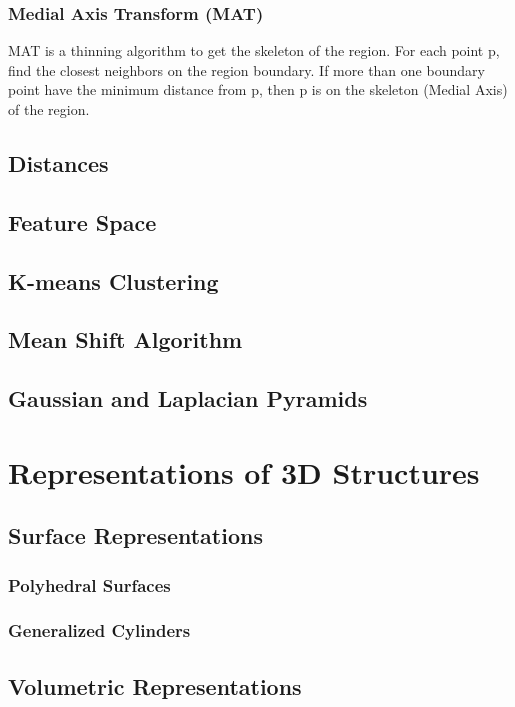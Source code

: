 \documentclass{article}
\begin{document}
\begin{multicols}{2}
 \subsubsection{Medial Axis Transform (MAT)}


  MAT is a thinning algorithm to get the skeleton of the region.
  For each point p, find the closest neighbors on the region boundary.
  If more than one boundary point have the minimum distance from p, then p is on the skeleton (Medial Axis) of the region.

  \vspace{5mm}

  

\subsection{Distances}
\subsection{Feature Space}
\subsection{K-means Clustering}
\subsection{Mean Shift Algorithm}
\subsection{Gaussian and Laplacian Pyramids}

\section{Representations of 3D Structures}
\subsection{Surface Representations}
\subsubsection{Polyhedral Surfaces}
\subsubsection{Generalized Cylinders}
\subsection{Volumetric Representations}

\end{multicols}
\end{document}
